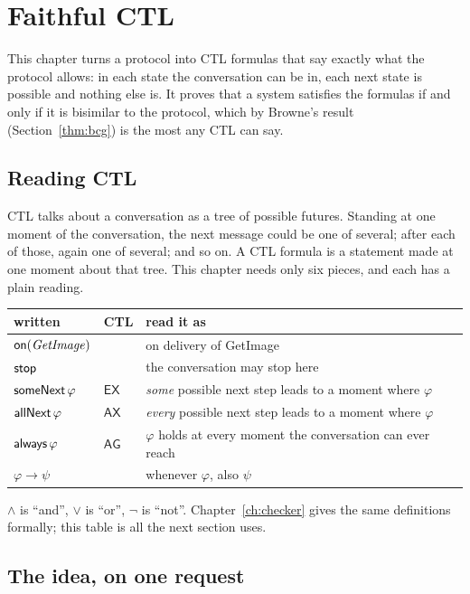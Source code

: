 \chapter{Faithful CTL}\label{ch:faithful}

This chapter turns a protocol into CTL formulas that say exactly what the protocol
allows: in each state the conversation can be in, each next state is possible and
nothing else is. It proves that a system satisfies the formulas if and only if it is
bisimilar to the protocol, which by Browne's result (Section~\ref{thm:bcg}) is the most any CTL can say.

\section{Reading CTL}

CTL talks about a conversation as a tree of possible futures. Standing at one moment of
the conversation, the next message could be one of several; after each of those, again
one of several; and so on. A CTL formula is a statement made at one moment about that
tree. This chapter needs only six pieces, and each has a plain reading.

\begin{center}
\begin{tabular}{@{}lll@{}}
\toprule
written & CTL & read it as \\
\midrule
$\mathsf{on}(\mathit{GetImage})$ & & on delivery of GetImage \\
$\mathsf{stop}$ & & the conversation may stop here \\
$\mathsf{someNext}\,\varphi$ & $\mathsf{EX}$ & \emph{some} possible next step leads to a moment where $\varphi$ \\
$\mathsf{allNext}\,\varphi$ & $\mathsf{AX}$ & \emph{every} possible next step leads to a moment where $\varphi$ \\
$\mathsf{always}\,\varphi$ & $\mathsf{AG}$ & $\varphi$ holds at every moment the conversation can ever reach \\
$\varphi\rightarrow\psi$ & & whenever $\varphi$, also $\psi$ \\
\bottomrule
\end{tabular}
\end{center}

$\wedge$ is ``and'', $\vee$ is ``or'', $\neg$ is ``not''. Chapter~\ref{ch:checker} gives
the same definitions formally; this table is all the next section uses.

\section{The idea, on one request}

